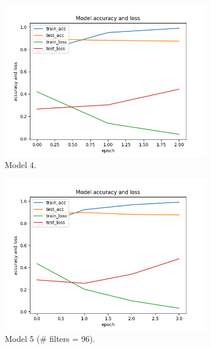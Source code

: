 \documentclass[11pt]{article}
\begin{document}
\begin{figure}[h!]
\begin{subfigure}{0.32\textwidth}
         \includegraphics[width=\textwidth]{model4.png}
         \caption{Model 4.}
         \label{fig:model4}
\end{subfigure}
\hfill
\begin{subfigure}{0.32\textwidth}
         \centering
         \includegraphics[width=\textwidth]{model5.png}
         \caption{Model 5 (\# filters = 96).}
         \label{fig:model5}
\end{subfigure}
\begin{subfigure}{0.32\textwidth}
         \centering

\end{subfigure}
\end{figure}
\end{document}
